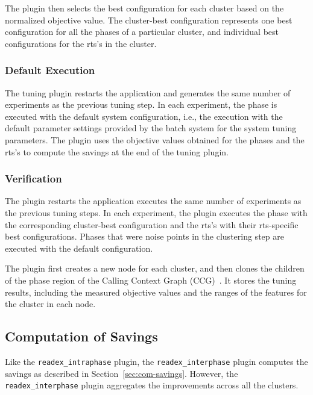 The plugin then selects the best configuration for each cluster based on the normalized objective value. The cluster-best configuration represents one best configuration for all the phases of a particular cluster, and individual best configurations for the rts's in the cluster.

\subsubsection{Default Execution} \label{default-execution} 
The tuning plugin restarts the application and generates the same number of experiments as the previous tuning step. In each experiment, the phase is executed with the default system configuration, i.e., the execution with the default parameter settings provided by the batch system for the system tuning parameters. The plugin uses the objective values obtained for the phases and the rts’s to compute the savings at the end of the tuning plugin.

\subsubsection{Verification} \label{verification} 
The plugin restarts the application executes the same number of experiments as the previous tuning steps. In each experiment, the plugin executes the phase with the
corresponding cluster-best configuration and the rts's with their rts-specific
best configurations. Phases that were noise points in the clustering step are executed with the default configuration.

The plugin first creates a new node for each cluster, and then clones the children of the phase region of the Calling Context Graph (CCG)~\cite{kumaraswamy2018design}. It stores the tuning results, including the measured objective values and the ranges of the features for the cluster in each node. 

\subsection{Computation of Savings}
Like the \texttt{readex\_intraphase} plugin, the \texttt{readex\_interphase} plugin computes the savings as described in Section~\ref{sec:com-savings}. However, the \texttt{readex\_interphase} plugin aggregates the improvements across all the clusters.


